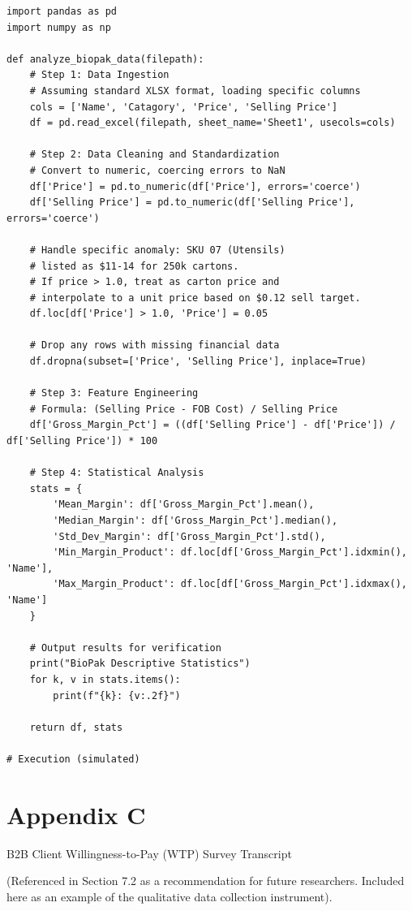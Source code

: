 \documentclass[12pt,a4paper]{article}
\begin{document}
\begin{lstlisting}[basicstyle=\ttfamily\small,breaklines=true,columns=fullflexible]
import pandas as pd
import numpy as np

def analyze_biopak_data(filepath):
    # Step 1: Data Ingestion
    # Assuming standard XLSX format, loading specific columns
    cols = ['Name', 'Catagory', 'Price', 'Selling Price']
    df = pd.read_excel(filepath, sheet_name='Sheet1', usecols=cols)

    # Step 2: Data Cleaning and Standardization
    # Convert to numeric, coercing errors to NaN
    df['Price'] = pd.to_numeric(df['Price'], errors='coerce')
    df['Selling Price'] = pd.to_numeric(df['Selling Price'], errors='coerce')

    # Handle specific anomaly: SKU 07 (Utensils)
    # listed as $11-14 for 250k cartons.
    # If price > 1.0, treat as carton price and
    # interpolate to a unit price based on $0.12 sell target.
    df.loc[df['Price'] > 1.0, 'Price'] = 0.05

    # Drop any rows with missing financial data
    df.dropna(subset=['Price', 'Selling Price'], inplace=True)

    # Step 3: Feature Engineering
    # Formula: (Selling Price - FOB Cost) / Selling Price
    df['Gross_Margin_Pct'] = ((df['Selling Price'] - df['Price']) / df['Selling Price']) * 100

    # Step 4: Statistical Analysis
    stats = {
        'Mean_Margin': df['Gross_Margin_Pct'].mean(),
        'Median_Margin': df['Gross_Margin_Pct'].median(),
        'Std_Dev_Margin': df['Gross_Margin_Pct'].std(),
        'Min_Margin_Product': df.loc[df['Gross_Margin_Pct'].idxmin(), 'Name'],
        'Max_Margin_Product': df.loc[df['Gross_Margin_Pct'].idxmax(), 'Name']
    }

    # Output results for verification
    print("BioPak Descriptive Statistics")
    for k, v in stats.items():
        print(f"{k}: {v:.2f}")

    return df, stats

# Execution (simulated)
\end{lstlisting}

\section*{Appendix C}

B2B Client Willingness-to-Pay (WTP) Survey Transcript

(Referenced in Section 7.2 as a recommendation for future researchers. Included here as an example of the qualitative data collection instrument).
\end{document}
